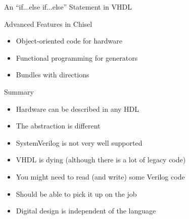 \begin{frame}[fragile]{An ``if...else  if...else'' Statement in VHDL}
\end{frame}


\begin{frame}[fragile]{Advanced Features in Chisel}
\begin{itemize}
\item Object-oriented code for hardware
\item Functional programming for generators
\item Bundles with directions
\end{itemize}
\end{frame}


\begin{frame}[fragile]{Summary}
\begin{itemize}
\item Hardware can be described in any HDL
\item The abstraction is different
\item SystemVerilog is not very well supported
\item VHDL is dying (although there is a lot of legacy code)
\item You might need to read (and write) some Verilog code
\item Should be able to pick it up on the job
\item Digital design is independent of the language
\end{itemize}
\end{frame}







